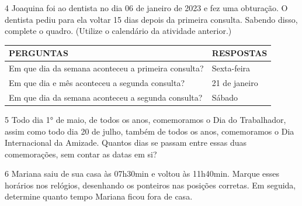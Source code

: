 \num{4} Joaquina foi ao dentista no dia 06 de janeiro de 2023 e fez uma
obturação. O dentista pediu para ela voltar 15 dias depois da primeira
consulta. Sabendo disso, complete o quadro. (Utilize o calendário
da atividade anterior.)

\begin{longtable}[]{@{}ll@{}}
\toprule
PERGUNTAS & RESPOSTAS\tabularnewline
\midrule
\endhead
Em que dia da semana aconteceu a primeira consulta? & Sexta-feira\tabularnewline
Em que dia e mês aconteceu a segunda consulta? & 21 de
janeiro\tabularnewline
Em que dia da semana aconteceu a segunda consulta? &
Sábado\tabularnewline
\bottomrule
\end{longtable}

\num{5} Todo dia 1° de maio, de todos os anos, comemoramos o Dia do Trabalhador,
assim como todo dia 20 de julho, também de todos os anos, comemoramos o
Dia Internacional da Amizade. Quantos dias se passam entre essas duas
comemorações, sem contar as datas em si?


\num{6} Mariana saiu de sua casa às 07h30min e voltou às 11h40min. Marque esses
horários nos relógios, desenhando os ponteiros nas posições
corretas. Em seguida, determine quanto tempo Mariana ficou fora de casa.


